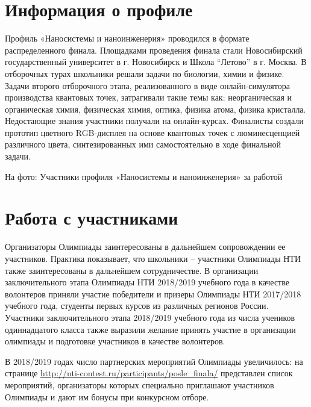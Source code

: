 \section*{Информация о профиле}

Профиль «Наносистемы и наноинженерия» проводился в формате распределенного финала. Площадками проведения финала стали Новосибирский государственный университет в г. Новосибирск и Школа “Летово” в г. Москва. В отборочных турах школьники решали задачи по биологии, химии и физике. Задачи второго отборочного этапа, реализованного в виде онлайн-симулятора производства квантовых точек, затрагивали такие темы как: неорганическая и органическая химия, физическая химия, оптика, физика атома, физика кристалла. Недостающие знания участники получали на онлайн-курсах. Финалисты создали прототип цветного RGB-дисплея на основе квантовых точек с люминесценцией различного цвета, синтезированных ими самостоятельно в ходе финальной задачи.



\begin{center}
    На фото: Участники профиля «Наносистемы и наноинженерия» за работой
\end{center}

\section*{Работа с участниками}

Организаторы Олимпиады заинтересованы в дальнейшем сопровождении ее участников. Практика показывает, что школьники  –  участники Олимпиады НТИ также заинтересованы в дальнейшем сотрудничестве. В организации заключительного этапа Олимпиады НТИ 2018/2019 учебного года в качестве волонтеров приняли участие победители и призеры Олимпиады НТИ 2017/2018 учебного года, студенты первых курсов из различных регионов России. Участники заключительного этапа 2018/2019 учебного года из числа учеников одиннадцатого класса также выразили желание принять участие в организации олимпиады и подготовке участников в качестве волонтеров.  

В 2018/2019 годах число партнерских мероприятий Олимпиады увеличилось: на странице \url{http://nti-contest.ru/participants/posle_finala/} представлен список мероприятий, организаторы которых специально приглашают участников Олимпиады и дают им бонусы при конкурсном отборе.

